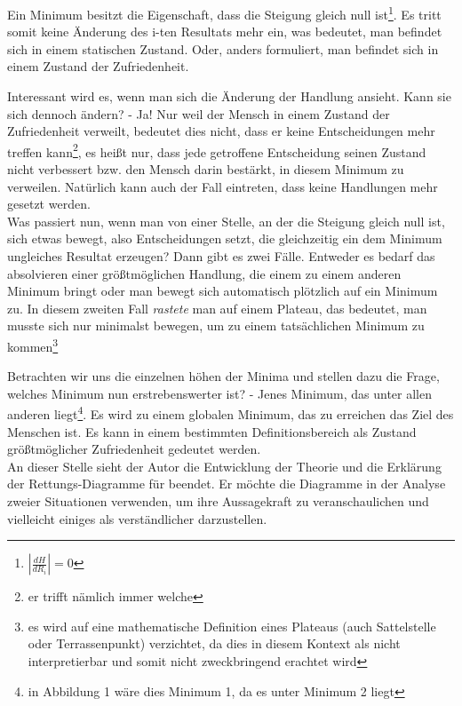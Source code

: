 \documentclass[12pt,a4paper,oneside]{article}
\begin{document}
  Ein Minimum besitzt die Eigenschaft, dass die Steigung gleich null ist\footnote{$|\frac{dH}{dR_i}| = 0$}. Es tritt somit keine Änderung des i-ten Resultats mehr ein, was bedeutet, man befindet sich in einem statischen Zustand. Oder, anders formuliert, man befindet sich in einem Zustand der Zufriedenheit. 
  
  Interessant wird es, wenn man sich die Änderung der Handlung ansieht. Kann sie sich dennoch ändern? - Ja! Nur weil der Mensch in einem Zustand der Zufriedenheit verweilt, bedeutet dies nicht, dass er keine Entscheidungen mehr treffen kann\footnote{er trifft nämlich immer welche}, es heißt nur, dass jede getroffene Entscheidung seinen Zustand nicht verbessert bzw. den Mensch darin bestärkt, in diesem Minimum zu verweilen. Natürlich kann auch der Fall eintreten, dass keine Handlungen mehr gesetzt werden.\\
  
  Was passiert nun, wenn man von einer Stelle, an der die Steigung gleich null ist, sich etwas bewegt, also Entscheidungen setzt, die gleichzeitig ein dem Minimum ungleiches Resultat erzeugen? Dann gibt es zwei Fälle. Entweder es bedarf das absolvieren einer größtmöglichen Handlung, die einem zu einem anderen Minimum bringt oder man bewegt sich automatisch plötzlich auf ein Minimum zu. In diesem zweiten Fall \textit{rastete} man auf einem Plateau, das bedeutet, man musste sich nur minimalst bewegen, um zu einem tatsächlichen Minimum zu kommen\footnote{es wird auf eine mathematische Definition eines Plateaus (auch Sattelstelle oder Terrassenpunkt) verzichtet, da dies in diesem Kontext als nicht interpretierbar und somit nicht zweckbringend erachtet wird}  
  
  Betrachten wir uns die einzelnen höhen der Minima und stellen dazu die Frage, welches Minimum nun erstrebenswerter ist? - Jenes Minimum, das unter allen anderen liegt\footnote{in Abbildung 1 wäre dies Minimum 1, da es unter Minimum 2 liegt}. Es wird zu einem globalen Minimum, das zu erreichen das Ziel des Menschen ist. Es kann in einem bestimmten Definitionsbereich als Zustand größtmöglicher Zufriedenheit gedeutet werden. \\
  
  An dieser Stelle sieht der Autor die Entwicklung der Theorie und die Erklärung der Rettungs-Diagramme für beendet. Er möchte die Diagramme in der Analyse zweier Situationen verwenden, um ihre Aussagekraft zu veranschaulichen und vielleicht einiges als verständlicher darzustellen. \\
  
\end{document}
